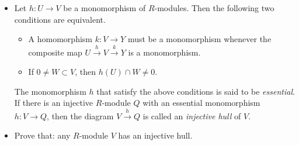 \begin{itemize}
    \item[(i)] Let $h : U \to V$ be a monomorphism of $R$-modules. Then the following two conditions are equivalent.
    \begin{itemize}
        \item[(a)] A homomorphism $k : V \to Y$ must be a monomorphism whenever the composite map $U \xrightarrow{h} V \xrightarrow{k} Y$ is a monomorphism.
        \item[(b)] If $0 \neq W \subset V$, then $h(U) \cap W \neq 0$.
    \end{itemize}
    The monomorphism $h$ that satisfy the above conditions is said to be \textit{essential}. If there is an injective $R$-module $Q$ with an essential monomorphism $h : V \to Q$, then the diagram $V \xrightarrow{h} Q$ is called an \textit{injective hull} of $V$.

    \item[(ii)] Prove that: any $R$-module $V$ has an injective hull.
\end{itemize}
